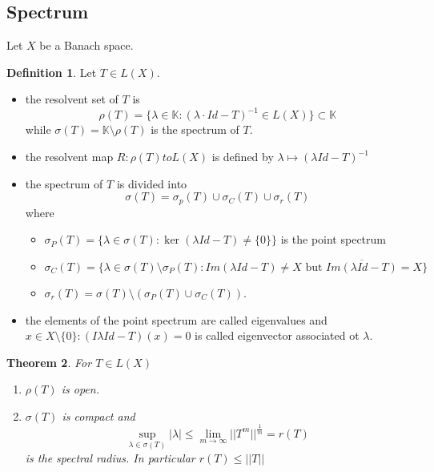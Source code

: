 \documentclass[a4paper, 12pt]{article}
\theoremstyle{plain}
\newtheorem{theorem}{Theorem}[subsection] %
\theoremstyle{definition}
\newtheorem{definition}[theorem]{Definition} %
\theoremstyle{lemma}
\theoremstyle{remark}
\theoremstyle{corollary}
\theoremstyle{example}
\begin{document}
	\subsection{Spectrum}
	Let $X$ be a Banach space.
	\begin{definition}
		Let $T\in L(X)$. \begin{itemize}
			\item the resolvent set of $T$ is \[\rho(T) = \{\lambda \in \mathbb{K}: (\lambda \cdot Id - T)^{-1}\in L(X)\}\subset \mathbb{K}\]
			while $\sigma(T) = \mathbb{K}\setminus \rho(T)$ is the spectrum of $T$.
			\item the resolvent map $R: \rho(T) to L(X)$ is defined by $\lambda \mapsto (\lambda Id - T)^{-1}$
			\item the spectrum of $T$ is divided into \[\sigma(T) = \sigma_p(T)\cup \sigma_C(T) \cup \sigma_r(T)\] where \begin{itemize}
				\item $\sigma_P(T) = \{\lambda \in \sigma(T): \ker (\lambda Id - T) \neq \{0\}\}$ is the point spectrum
				\item $\sigma_C(T) = \{\lambda \in \sigma(T)\setminus \sigma_P(T): Im (\lambda Id- T) \neq X \text{ but } \overline{Im (\lambda Id - T)} = X\}$
				\item $\sigma_r(T) = \sigma(T) \setminus (\sigma_P(T) \cup \sigma_C(T))$.
			\end{itemize}
		\item the elements of the point spectrum are called eigenvalues and $x \in X\setminus \{0\}: (I\lambda Id - T)(x) = 0$ is called eigenvector associated ot $\lambda$.
		\end{itemize}
	\end{definition}
	\begin{theorem}
		For $T\in L(X)$ \begin{enumerate}
			\item $\rho(T)$ is open.
			\item $\sigma(T)$ is compact and \[\sup_{\lambda \in \sigma(T)} \left|\lambda\right| \leq \lim_{m \to \infty} ||T^m||^{\frac{1}{m}} = r(T)\] is the spectral radius. In particular $r(T) \leq ||T||$
		\end{enumerate}
	\end{theorem}
\end{document}
